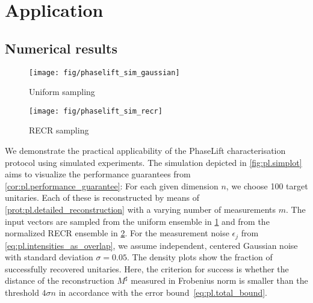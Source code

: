 \section{Application}%
\label{sec:pl.results}

\subsection{Numerical results}%
\label{sub:pl.results.numerics}

\begin{figure*}[tbp]
  \begin{subfigure}{.475\columnwidth}
    \texttt{[image: fig/phaselift\_sim\_gaussian]}
    \caption{\label{sfig:pl.simplot.gaussian}%
      Uniform sampling
    }
   \end{subfigure}
  \begin{subfigure}{.475\columnwidth}
    \texttt{[image: fig/phaselift\_sim\_recr]}
    \caption{\label{sfig:pl.simplot.recr}%
      RECR sampling
    }
   \end{subfigure}
  \caption{\label{fig:pl.simplot}%
    Simulated recovery-probability using the two different sampling schemes under noisy measurements with $\sigma = 0.05$.
    For each given dimension, the transfer matrices to be recovered consist of 97 Haar random unitaries as well as the identity, the swap-matrix, and the discrete Fourier transform.
    The red line indicates the conjectured phase transition at $4 n - 4$.
  }
\end{figure*}

We demonstrate the practical applicability of the PhaseLift characterisation protocol using simulated experiments.
The simulation depicted in \cref{fig:pl.simplot} aims to visualize the performance guarantees from \cref{cor:pl.performance_guarantee}:
For each given dimension $n$, we choose 100 target unitaries.
Each of these is reconstructed by means of \cref{prot:pl.detailed_reconstruction} with a varying number of measurements $m$.
The input vectors are sampled from the uniform ensemble in \cref{sfig:pl.simplot.gaussian} and from the normalized RECR ensemble in \cref{sfig:pl.simplot.recr}.
For the measurement noise $\epsilon_j$ from \cref{eq:pl.intensities_as_overlap}, we assume independent, centered Gaussian noise with standard deviation $\sigma = 0.05$.
The density plots show the fraction of successfully recovered unitaries.
Here, the criterion for success is whether the distance of the reconstruction $M^\sharp$ measured in Frobenius norm is smaller than the threshold  $4 \sigma n$ in accordance with the error bound~\eqref{eq:pl.total_bound}.

